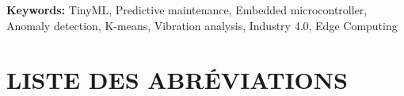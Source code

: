 \documentclass[oneside, french, a4paper, 12pt, reqno]{book}
\begin{document}
\vspace{0.5cm}
\noindent\textbf{Keywords:} TinyML, Predictive maintenance, Embedded microcontroller, Anomaly detection, K-means, Vibration analysis, Industry 4.0, Edge Computing

\cleardoublepage
\renewcommand*\contentsname{TABLE DES MATIÈRES}
\begin{spacing}{1}
    \tableofcontents
\end{spacing}

\cleardoublepage
\renewcommand{\listtablename}{LISTE DES TABLEAUX}
\listoftables

\cleardoublepage
\renewcommand{\listfigurename}{LISTE DES FIGURES}
\listoffigures

\chapter*{LISTE DES ABRÉVIATIONS}
\thispagestyle{plain}
\end{document}
